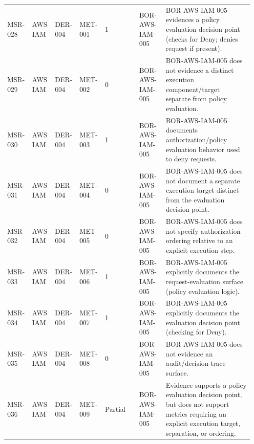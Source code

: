 \documentclass{article}
\begin{document}
\begin{longtable}{@{}p{}p{}p{}p{}p{}p{}p{}p{}@{}}
MSR-028 & AWS IAM & DER-004 & MET-001 & 1 &  & BOR-AWS-IAM-005 & BOR-AWS-IAM-005 evidences a policy evaluation decision point (checks for Deny; denies request if present).\\
MSR-029 & AWS IAM & DER-004 & MET-002 & 0 &  & BOR-AWS-IAM-005 & BOR-AWS-IAM-005 does not evidence a distinct execution component/target separate from policy evaluation.\\
MSR-030 & AWS IAM & DER-004 & MET-003 & 1 &  & BOR-AWS-IAM-005 & BOR-AWS-IAM-005 documents authorization/policy evaluation behavior used to deny requests.\\
MSR-031 & AWS IAM & DER-004 & MET-004 & 0 &  & BOR-AWS-IAM-005 & BOR-AWS-IAM-005 does not document a separate execution target distinct from the evaluation decision point.\\
MSR-032 & AWS IAM & DER-004 & MET-005 & 0 &  & BOR-AWS-IAM-005 & BOR-AWS-IAM-005 does not specify authorization ordering relative to an explicit execution step.\\
MSR-033 & AWS IAM & DER-004 & MET-006 & 1 &  & BOR-AWS-IAM-005 & BOR-AWS-IAM-005 explicitly documents the request-evaluation surface (policy evaluation logic).\\
MSR-034 & AWS IAM & DER-004 & MET-007 & 1 &  & BOR-AWS-IAM-005 & BOR-AWS-IAM-005 explicitly documents the evaluation decision point (checking for Deny).\\
MSR-035 & AWS IAM & DER-004 & MET-008 & 0 &  & BOR-AWS-IAM-005 & BOR-AWS-IAM-005 does not evidence an audit/decision-trace surface.\\
MSR-036 & AWS IAM & DER-004 & MET-009 & Partial &  & BOR-AWS-IAM-005 & Evidence supports a policy evaluation decision point, but does not support metrics requiring an explicit execution target, separation, or ordering.\\


\end{longtable}
\end{document}
